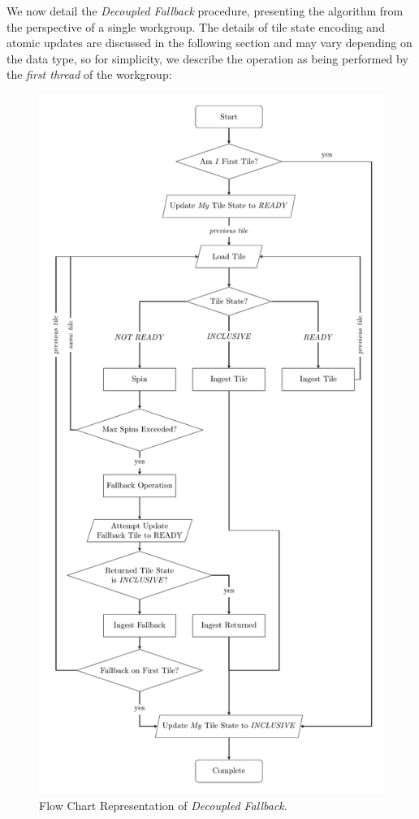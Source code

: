 \documentclass[acmsmall, manuscript, screen, review, anonymous]{acmart}
\begin{document}
We now detail the \emph{Decoupled Fallback} procedure, presenting the algorithm from the perspective of a single workgroup. The details of tile state encoding and atomic updates are discussed in the following section and may vary depending on the data type, so for simplicity, we describe the operation as being performed by the \emph{first thread} of the workgroup:
\begin{figure}
  \centering
  \includegraphics[height=\textheight]{graphics/FlowChart.pdf}
  \caption{Flow Chart Representation of \emph{Decoupled Fallback}.\label{fig:decoupled_fallback}}
\end{figure}
\end{document}
